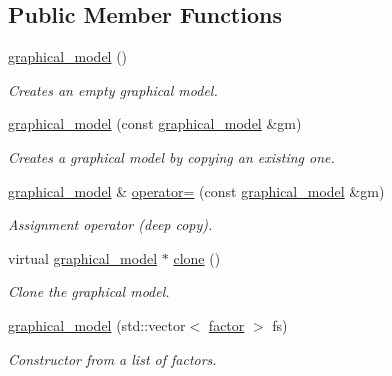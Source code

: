 \subsection*{Public Member Functions}
\begin{DoxyCompactItemize}
\item 
\hypertarget{classmerlin_1_1graphical__model_a5ee627101e4251833f1f6dd40cb34322}{}\hyperlink{classmerlin_1_1graphical__model_a5ee627101e4251833f1f6dd40cb34322}{graphical\+\_\+model} ()\label{classmerlin_1_1graphical__model_a5ee627101e4251833f1f6dd40cb34322}

\begin{DoxyCompactList}\small\item\em Creates an empty graphical model. \end{DoxyCompactList}\item 
\hyperlink{classmerlin_1_1graphical__model_aa35a615de634e3115f0ee3a5fcc7919e}{graphical\+\_\+model} (const \hyperlink{classmerlin_1_1graphical__model}{graphical\+\_\+model} \&gm)
\begin{DoxyCompactList}\small\item\em Creates a graphical model by copying an existing one. \end{DoxyCompactList}\item 
\hyperlink{classmerlin_1_1graphical__model}{graphical\+\_\+model} \& \hyperlink{classmerlin_1_1graphical__model_aa9b0f8a5d4e2098fce8e64f3778245e3}{operator=} (const \hyperlink{classmerlin_1_1graphical__model}{graphical\+\_\+model} \&gm)
\begin{DoxyCompactList}\small\item\em Assignment operator (deep copy). \end{DoxyCompactList}\item 
virtual \hyperlink{classmerlin_1_1graphical__model}{graphical\+\_\+model} $\ast$ \hyperlink{classmerlin_1_1graphical__model_a5315423e0cda62c03beda959b1311f48}{clone} ()
\begin{DoxyCompactList}\small\item\em Clone the graphical model. \end{DoxyCompactList}\item 
\hyperlink{classmerlin_1_1graphical__model_a322196c5146e7c660d5bf1c319fd691a}{graphical\+\_\+model} (std\+::vector$<$ \hyperlink{classmerlin_1_1factor}{factor} $>$ fs)
\begin{DoxyCompactList}\small\item\em Constructor from a list of factors. \end{DoxyCompactList}\item 

\end{DoxyCompactItemize}
